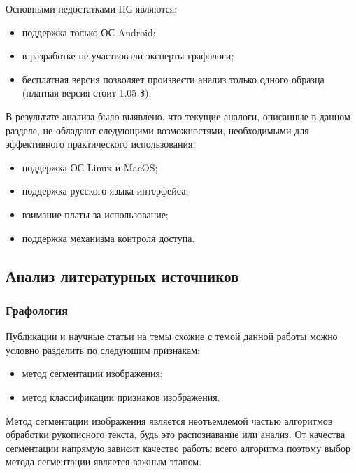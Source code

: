 Основными недостатками ПС являются:
\begin{itemize}
  \item поддержка только ОС Android;
  \item в разработке не участвовали эксперты графологи;
  \item бесплатная версия позволяет произвести анализ только одного образца (платная версия стоит 1.05 \$).
\end{itemize}

В результате анализа было выявлено, что текущие аналоги, описанные в данном разделе, не обладают следующими возможностями, необходимыми для эффективного практического использования:
\begin{itemize}
  \item поддержка ОС Linux и MacOS;
  \item поддержка русского языка интерфейса;
  \item взимание платы за использование;
  \item поддержка механизма контроля доступа.
\end{itemize}

\subsection{Анализ литературных источников}
\label{sub:domain:literary_sources}

\subsubsection{Графология}
Публикации и научные статьи на темы схожие с темой данной работы можно условно разделить по следующим признакам:
\begin{itemize}
  \item метод сегментации изображения;
  \item метод классификации признаков изображения.
\end{itemize}

Метод сегментации изображения является неотъемлемой частью алгоритмов обработки рукописного текста, будь это распознавание или анализ. От качества сегментации напрямую зависит качество работы всего алгоритма поэтому выбор метода сегментации является важным этапом.

